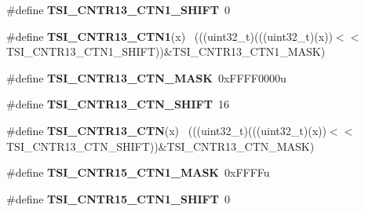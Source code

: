 \begin{DoxyCompactItemize}
\item 
\hypertarget{group___t_s_i___register___masks_gad19e50775ced3a5322d93b67c6019536}{}\#define {\bfseries T\+S\+I\+\_\+\+C\+N\+T\+R13\+\_\+\+C\+T\+N1\+\_\+\+S\+H\+I\+F\+T}~0\label{group___t_s_i___register___masks_gad19e50775ced3a5322d93b67c6019536}

\item 
\hypertarget{group___t_s_i___register___masks_ga303046b18a5643a3d2c41c7285e0efa7}{}\#define {\bfseries T\+S\+I\+\_\+\+C\+N\+T\+R13\+\_\+\+C\+T\+N1}(x)                                          ~(((uint32\+\_\+t)(((uint32\+\_\+t)(x))$<$$<$T\+S\+I\+\_\+\+C\+N\+T\+R13\+\_\+\+C\+T\+N1\+\_\+\+S\+H\+I\+F\+T))\&T\+S\+I\+\_\+\+C\+N\+T\+R13\+\_\+\+C\+T\+N1\+\_\+\+M\+A\+S\+K)\label{group___t_s_i___register___masks_ga303046b18a5643a3d2c41c7285e0efa7}

\item 
\hypertarget{group___t_s_i___register___masks_gac4b6ed4489dd39029223b49be774965a}{}\#define {\bfseries T\+S\+I\+\_\+\+C\+N\+T\+R13\+\_\+\+C\+T\+N\+\_\+\+M\+A\+S\+K}~0x\+F\+F\+F\+F0000u\label{group___t_s_i___register___masks_gac4b6ed4489dd39029223b49be774965a}

\item 
\hypertarget{group___t_s_i___register___masks_gaffd92baf7411ffdc73289bcf96764e3a}{}\#define {\bfseries T\+S\+I\+\_\+\+C\+N\+T\+R13\+\_\+\+C\+T\+N\+\_\+\+S\+H\+I\+F\+T}~16\label{group___t_s_i___register___masks_gaffd92baf7411ffdc73289bcf96764e3a}

\item 
\hypertarget{group___t_s_i___register___masks_ga2501cf6e6a26ae480b270ae90da03716}{}\#define {\bfseries T\+S\+I\+\_\+\+C\+N\+T\+R13\+\_\+\+C\+T\+N}(x)                                            ~(((uint32\+\_\+t)(((uint32\+\_\+t)(x))$<$$<$T\+S\+I\+\_\+\+C\+N\+T\+R13\+\_\+\+C\+T\+N\+\_\+\+S\+H\+I\+F\+T))\&T\+S\+I\+\_\+\+C\+N\+T\+R13\+\_\+\+C\+T\+N\+\_\+\+M\+A\+S\+K)\label{group___t_s_i___register___masks_ga2501cf6e6a26ae480b270ae90da03716}

\item 
\hypertarget{group___t_s_i___register___masks_gaa249fbc86511094b5b4ea1cfdff064d1}{}\#define {\bfseries T\+S\+I\+\_\+\+C\+N\+T\+R15\+\_\+\+C\+T\+N1\+\_\+\+M\+A\+S\+K}~0x\+F\+F\+F\+Fu\label{group___t_s_i___register___masks_gaa249fbc86511094b5b4ea1cfdff064d1}

\item 
\hypertarget{group___t_s_i___register___masks_ga7938e4586802c6fa57e4d0145b36aa70}{}\#define {\bfseries T\+S\+I\+\_\+\+C\+N\+T\+R15\+\_\+\+C\+T\+N1\+\_\+\+S\+H\+I\+F\+T}~0\label{group___t_s_i___register___masks_ga7938e4586802c6fa57e4d0145b36aa70}


\end{DoxyCompactItemize}
